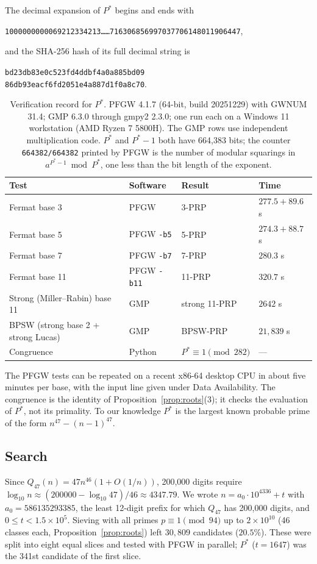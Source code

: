 \documentclass[11pt,a4paper]{article}
\theoremstyle{remark}
\begin{document}
The decimal expansion of $P^\ast$ begins and ends with
\begin{center}
\texttt{1000000000069212334213\ldots}\qquad\qquad\texttt{\ldots716306856997037706148011906447},
\end{center}
and the SHA-256 hash of its full decimal string is
\begin{center}
\small\texttt{bd23db83e0c523fd4ddbf4a0a885bd09}\\
\small\texttt{86db93eacf6fd2051e4a887d1f0a8c70}.
\end{center}

\begin{table}[h]
\centering
\caption{Verification record for $P^\ast$. PFGW 4.1.7 (64-bit, build 20251229) with GWNUM 31.4; GMP 6.3.0 through gmpy2 2.3.0; one run each on a Windows 11 workstation (AMD Ryzen 7 5800H). The GMP rows use independent multiplication code. $P^\ast$ and $P^\ast-1$ both have 664,383 bits; the counter \texttt{664382/664382} printed by PFGW is the number of modular squarings in $a^{P^\ast-1}\bmod P^\ast$, one less than the bit length of the exponent.}\label{tab:prp}
\begin{tabular}{llll}
\toprule
Test & Software & Result & Time\\
\midrule
Fermat base 3 & PFGW & 3-PRP & $277.5 + 89.6$ s\\
Fermat base 5 & PFGW \texttt{-b5} & 5-PRP & $274.3 + 88.7$ s\\
Fermat base 7 & PFGW \texttt{-b7} & 7-PRP & $280.3$ s\\
Fermat base 11 & PFGW \texttt{-b11} & 11-PRP & $320.7$ s\\
Strong (Miller--Rabin) base 11 & GMP & strong 11-PRP & $2642$ s\\
BPSW (strong base 2 + strong Lucas) & GMP & BPSW-PRP & $21{,}839$ s\\
Congruence & Python & $P^\ast\equiv1\pmod{282}$ & ---\\
\bottomrule
\end{tabular}
\end{table}

The PFGW tests can be repeated on a recent x86-64 desktop CPU in about five minutes per base, with the input line given under Data Availability. The congruence is the identity of Proposition~\ref{prop:roots}(3); it checks the evaluation of $P^\ast$, not its primality. To our knowledge $P^\ast$ is the largest known probable prime of the form $n^{47}-(n-1)^{47}$.

\subsection{Search}
Since $Q_{47}(n)=47n^{46}(1+O(1/n))$, 200,000 digits require $\log_{10}n\approx(200000-\log_{10}47)/46\approx4347.79$. We wrote $n=a_0\cdot10^{4336}+t$ with $a_0=586135293385$, the least 12-digit prefix for which $Q_{47}$ has 200,000 digits, and $0\le t<1.5\times10^5$. Sieving with all primes $p\equiv1\pmod{94}$ up to $2\times10^{10}$ (46 classes each, Proposition~\ref{prop:roots}) left $30{,}809$ candidates ($20.5\%$). These were split into eight equal slices and tested with PFGW in parallel; $P^\ast$ ($t=1647$) was the 341st candidate of the first slice.
\end{document}
